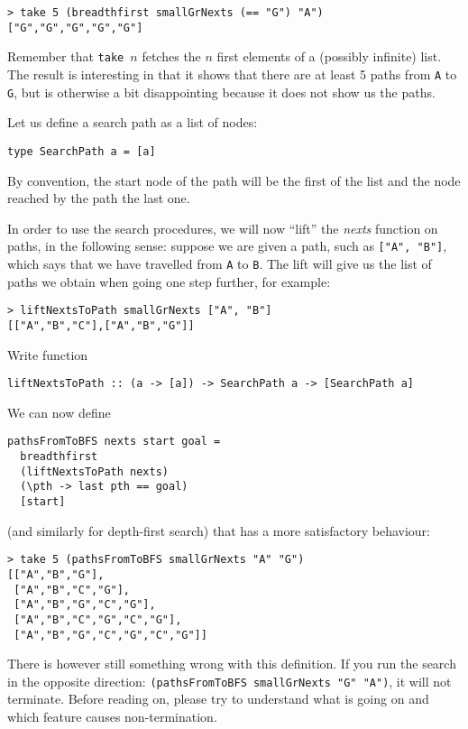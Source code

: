 \documentclass[english]{article}
\begin{document}
\begin{lstlisting}
> take 5 (breadthfirst smallGrNexts (== "G") "A")
["G","G","G","G","G"]
\end{lstlisting}
Remember that \texttt{take $n$} fetches the $n$ first elements of a (possibly
infinite) list.  The result is interesting in that it shows that there are at least 5
paths from \texttt{A} to \texttt{G}, but is otherwise a bit disappointing
because it does not show us the paths.

Let us define a search path as a list of nodes:
\begin{lstlisting}
type SearchPath a = [a]
\end{lstlisting}
By convention, the start node of the path will be the first of the list and
the node reached by the path the last one.

In order to use the search procedures, we will now ``lift'' the \emph{nexts}
function on paths, in the following sense: suppose we are given a path, such as
\texttt{["A", "B"]}, which says that we have travelled from \texttt{A} to
\texttt{B}. The lift will give us the list of paths we obtain when going one
step further, for example:

\begin{lstlisting}
> liftNextsToPath smallGrNexts ["A", "B"]
[["A","B","C"],["A","B","G"]]
\end{lstlisting}


\begin{exo}\label{exo:liftNextsToPath}
Write function
\begin{lstlisting}
liftNextsToPath :: (a -> [a]) -> SearchPath a -> [SearchPath a]
\end{lstlisting}
\end{exo}

We can now define 

\begin{lstlisting}
pathsFromToBFS nexts start goal =
  breadthfirst
  (liftNextsToPath nexts)
  (\pth -> last pth == goal)
  [start]
\end{lstlisting}
(and similarly for depth-first search) that has a more satisfactory behaviour:

\begin{lstlisting}
> take 5 (pathsFromToBFS smallGrNexts "A" "G")
[["A","B","G"],
 ["A","B","C","G"],
 ["A","B","G","C","G"],
 ["A","B","C","G","C","G"],
 ["A","B","G","C","G","C","G"]]
\end{lstlisting}

There is however still something wrong with this definition. If you run the
search in the opposite direction: \texttt{(pathsFromToBFS smallGrNexts "G" "A")},  
it will not terminate. Before reading on, please try to understand
what is going on and which feature causes non-termination.
\end{document}
